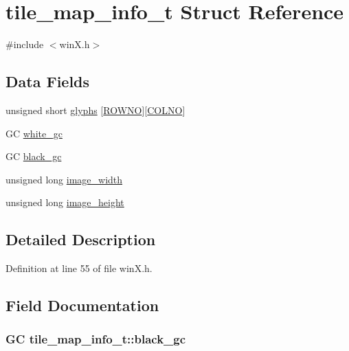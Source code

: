 \hypertarget{structtile__map__info__t}{\section{tile\+\_\+map\+\_\+info\+\_\+t Struct Reference}
\label{structtile__map__info__t}
}


{\ttfamily \#include $<$win\+X.\+h$>$}

\subsection*{Data Fields}
\begin{DoxyCompactItemize}
\item 
unsigned short \hyperlink{structtile__map__info__t_a8d55ef351991c46cbbec36471b28c19d}{glyphs} \mbox{[}\hyperlink{gnmap_8c_a9cce134868d97b23c35bcf1ff4a343d8}{R\+O\+W\+N\+O}\mbox{]}\mbox{[}\hyperlink{gnmap_8c_a308dbfcc29f5a427c0315f3cbf03c3ed}{C\+O\+L\+N\+O}\mbox{]}
\item 
G\+C \hyperlink{structtile__map__info__t_a3ea92989ad6f713bd32bade086be7c64}{white\+\_\+gc}
\item 
G\+C \hyperlink{structtile__map__info__t_a8c0caa051bdeff44e65d8c57f0319e87}{black\+\_\+gc}
\item 
unsigned long \hyperlink{structtile__map__info__t_aaaaff269c12a93230ddd2a565690871a}{image\+\_\+width}
\item 
unsigned long \hyperlink{structtile__map__info__t_a76968db088c03de48d2412082d5494f0}{image\+\_\+height}
\end{DoxyCompactItemize}


\subsection{Detailed Description}


Definition at line 55 of file win\+X.\+h.



\subsection{Field Documentation}
\hypertarget{structtile__map__info__t_a8c0caa051bdeff44e65d8c57f0319e87}{
\subsubsection[{black\+\_\+gc}]{\setlength{\rightskip}{0pt plus 5cm}G\+C tile\+\_\+map\+\_\+info\+\_\+t\+::black\+\_\+gc}}\label{structtile__map__info__t_a8c0caa051bdeff44e65d8c57f0319e87}


